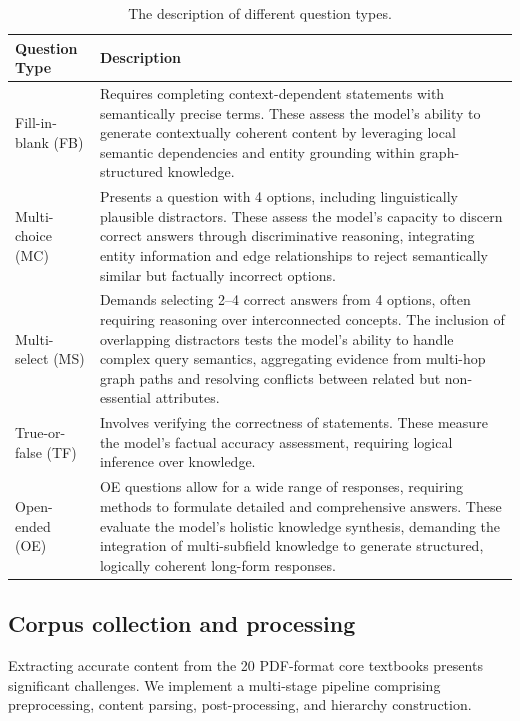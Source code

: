 \documentclass{article}
\begin{document}
\begin{table}[htbp]
\centering
\begin{tabularx}{\linewidth}{lX}
\toprule
\textbf{Question Type} & \textbf{Description} \\
\midrule
Fill-in-blank (FB) & Requires completing context-dependent statements with semantically precise terms. These assess the model’s ability to generate contextually coherent content by leveraging local semantic dependencies and entity grounding within graph-structured knowledge. \\
\addlinespace
Multi-choice (MC) & Presents a question with 4 options, including linguistically plausible distractors. These assess the model’s capacity to discern correct answers through discriminative reasoning, integrating entity information and edge relationships to reject semantically similar but factually incorrect options. \\
\addlinespace
Multi-select (MS) & Demands selecting 2–4 correct answers from 4 options, often requiring reasoning over interconnected concepts. The inclusion of overlapping distractors tests the model’s ability to handle complex query semantics, aggregating evidence from multi-hop graph paths and resolving conflicts between related but non-essential attributes. \\
\addlinespace
True-or-false (TF) & Involves verifying the correctness of statements. These measure the model’s factual accuracy assessment, requiring logical inference over knowledge. \\
\addlinespace
Open-ended (OE) & OE questions allow for a wide range of responses, requiring methods to formulate detailed and comprehensive answers. These evaluate the model’s holistic knowledge synthesis, demanding the integration of multi-subfield knowledge to generate structured, logically coherent long-form responses. \\
\bottomrule
\end{tabularx}
\caption{The description of different question types.}
\label{question_type}
\end{table}

\subsection{Corpus collection and processing}
Extracting accurate content from the 20 PDF-format core textbooks presents significant challenges. We implement a multi-stage pipeline comprising preprocessing, content parsing, post-processing, and hierarchy construction. 
\end{document}

